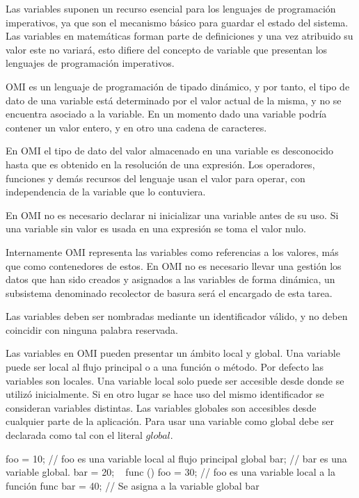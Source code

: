Las variables suponen un recurso esencial para los lenguajes de programación imperativos, ya que son el mecanismo básico para guardar el estado del sistema. Las variables en matemáticas
forman parte de definiciones y una vez atribuido su valor este no variará, esto difiere del concepto de variable que presentan los lenguajes de programación imperativos. 


OMI es un lenguaje de programación de tipado dinámico, y por tanto, el tipo de dato de una variable está determinado por el valor actual de la misma, y no se encuentra 
asociado a la variable. En un momento dado una variable podría contener un valor entero, y en otro una cadena de caracteres. 

En OMI el tipo de dato del valor almacenado en una variable es desconocido hasta que es obtenido en la resolución de una expresión. Los operadores, funciones y demás recursos
del lenguaje usan el valor para operar, con independencia de la variable que lo contuviera.

En OMI no es necesario declarar ni inicializar una variable antes de su uso. Si una variable sin valor es usada en una expresión se toma el valor nulo.

Internamente OMI representa las variables como referencias a los valores, más que como contenedores de estos. En OMI no es necesario llevar una gestión los datos que han sido
creados y asignados a las variables de forma dinámica, un subsistema denominado recolector de basura será el encargado de esta tarea.

Las variables deben ser nombradas mediante un identificador válido, y no deben coincidir con ninguna palabra reservada. 

Las variables en OMI pueden presentar un ámbito local y global. Una variable puede ser local al flujo principal o a una función o método. Por defecto las variables son locales.
Una variable local solo puede ser accesible desde donde se utilizó inicialmente. Si en otro lugar se hace uso del mismo identificador se consideran variables distintas.
Las variables globales son accesibles desde cualquier parte de la aplicación. Para usar una variable como global debe ser declarada como tal con el literal $global$. \\


\begin{myverbatim}
   foo = 10; // foo es una variable local al flujo principal
   global bar; // bar es una variable global.
   bar = 20; 
   ~ func () {
      foo = 30; // foo es una variable local a la función func
      bar = 40; // Se asigna a la variable global bar
   }
\end{myverbatim}

